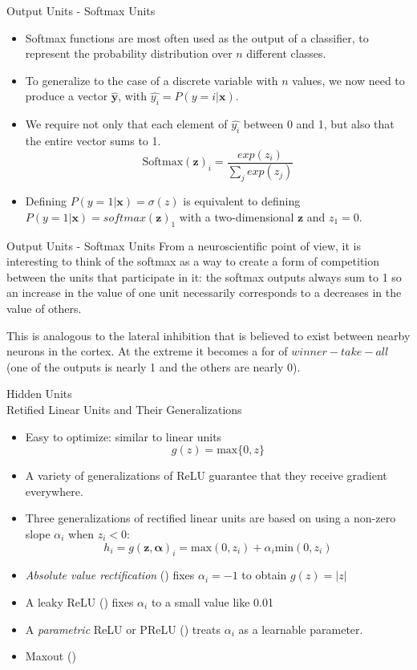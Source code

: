 \documentclass[10pt]{beamer}
\begin{document}
	\begin{frame}{Output Units - Softmax Units}
		\begin{itemize}
			\item Softmax functions are most often used as the output of a classifier, to represent the probability distribution over $n$ different classes.
			\item To generalize to the case of a discrete variable with $n$ values, we now need to produce a vector $\hat{\bm{y}}$, with $\hat{y_i}=P(y=i|\bm{x})$. 
			\item We require not only that each element of $\hat{y_i}$ between 0 and 1, but also that the entire vector sums to 1.
			$$\mathrm{Softmax}(\bm{z})_i=\frac{exp(z_i)}{\sum_jexp(z_j)}$$
			\item Defining $P(y=1|\bm{x})=\sigma(z)$ is equivalent to defining $P(y=1|\bm{x})=softmax(\bm{z})_1$ with a two-dimensional $\bm{z}$ and $z_1=0$.
			
		\end{itemize}
	\end{frame}

	\begin{frame}{Output Units - Softmax Units}
		From a neuroscientific point of view, it is interesting to think of the softmax as a way to create a form of competition between the units that participate in it: the softmax outputs always sum to 1 so an increase in the value of one unit necessarily corresponds to a decreases in the value of others. 
		
		This is analogous to the lateral inhibition that is believed to exist between nearby neurons in the cortex. At the extreme it becomes a for of $winner-take-all$ (one of the outputs is nearly 1 and the others are nearly 0).
	\end{frame}

	\begin{frame}{Hidden Units \\ Retified Linear Units and Their Generalizations}
		\begin{itemize}
			\item Easy to optimize: similar to linear units
			$$g(z)=\mathrm{max}\{0,z\}$$
			\item A variety of generalizations of ReLU guarantee that they receive gradient everywhere.
			\item Three generalizations of rectified linear units are based on using a non-zero slope $\alpha_i$ when $z_i<0$:
			$$h_i=g(\bm{z},\bm{\alpha})_i=\mathrm{max}(0,z_i)+\alpha_i\mathrm{min}(0,z_i)$$
		 	\item \emph{Absolute value rectification} (\citet{jarrett2009best}) fixes $\alpha_i=-1$ to obtain $g(z)=|z|$
		 	\item A leaky ReLU (\citet{maas2013rectifier}) fixes $\alpha_i$ to a small value like 0.01 
		 	\item A \emph{parametric} ReLU or PReLU (\citet{he2015delving}) treats $\alpha_i$ as a learnable parameter.
		 	\item Maxout (\citet{goodfellow2013maxout})
		\end{itemize}
	\end{frame}
\end{document}
